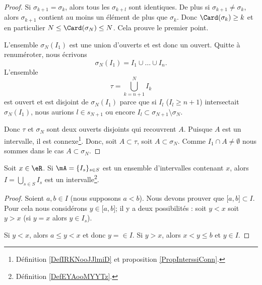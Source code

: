 \begin{proof}
	Si \( \sigma_{k+1}=\sigma_k\), alors tous les \( \sigma_{k+l}\) sont identiques. De plus si \( \sigma_{k+1}\neq \sigma_k\), alors \( \sigma_{k+1}\) contient au moins un élément de plus que \( \sigma_k\). Donc \( \Card(\sigma_k)\geq k\) et en particulier \( N\leq \Card(\sigma_N)\leq N\). Cela prouve le premier point.

	L'ensemble \( \sigma_N(I_1)\) est une union d'ouverts et est donc un ouvert. Quitte à renuméroter, nous écrivons
	\begin{equation}
		\sigma_N(I_1)=I_1\cup \ldots \cup I_n.
	\end{equation}
	L'ensemble
	\begin{equation}
		\tau=\bigcup_{k=n+1}^NI_k
	\end{equation}
	est ouvert et est disjoint de \( \sigma_N(I_1)\) parce que si \( I_l\) (\( I_l\geq n+1\)) intersectait \( \sigma_N(I_1)\), nous aurions \( l\in s_{N+1}\) ou encore \( I_l\subset \sigma_{N+1}\setminus\sigma_N\).

	Donc \( \tau\) et \( \sigma_N\) sont deux ouverts disjoints qui recouvrent \( A\). Puisque \( A\) est un intervalle, il est connexe\footnote{Définition \ref{DefIRKNooJJlmiD} et proposition \ref{PropInterssiConn}.}. Donc, soit \( A\subset \tau\), soit \( A\subset \sigma_N\). Comme \( I_1\cap A\neq \emptyset\) nous sommes dans le cas \( A\subset \sigma_N\).
\end{proof}

\begin{lemma}       \label{LEMooGHPTooKgFvGb}
	Soit \( x\in \eR\). Si \( \mA=\{ I_s \}_{s\in S}\) est un ensemble d'intervalles contenant \( x\), alors \( I=\bigcup_{s\in S}I_s\) est un intervalle\footnote{Définition \ref{DefEYAooMYYTz}.}.
\end{lemma}

\begin{proof}
	Soient \( a,b\in I \) (nous supposons \( a<b\)). Nous devons prouver que \( \mathopen[ a , b \mathclose]\subset I\). Pour cela nous considérons \( y\in \mathopen[ a , b \mathclose]\); il y a deux possibilités : soit \( y<x\) soit \( y>x\) (si \( y=x\) alors \( y\in I_s\)).

	Si \( y<x\), alors \( a\leq y<x\) et donc \( y=\in I\). Si \( y>x\), alors \( x<y\leq b\) et \( y\in I\).
\end{proof}


